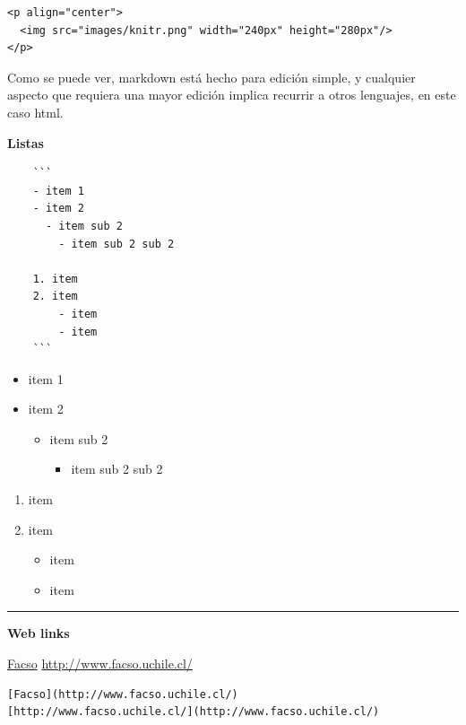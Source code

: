 \documentclass[11pt,]{book}
\providecommand{\tightlist}{%
  \setlength{\itemsep}{0pt}\setlength{\parskip}{0pt}}
\begin{document}
\begin{verbatim}
<p align="center">
  <img src="images/knitr.png" width="240px" height="280px"/>
</p>
\end{verbatim}

Como se puede ver, markdown está hecho para edición simple, y cualquier aspecto que requiera una mayor edición implica recurrir a otros lenguajes, en este caso html.

\textbf{Listas}

\begin{verbatim}
    ```
    - item 1
    - item 2
      - item sub 2
        - item sub 2 sub 2

    1. item
    2. item
        - item
        - item
    ```
\end{verbatim}

\begin{itemize}
\tightlist
\item
  item 1
\item
  item 2

  \begin{itemize}
  \tightlist
  \item
    item sub 2

    \begin{itemize}
    \tightlist
    \item
      item sub 2 sub 2
    \end{itemize}
  \end{itemize}
\end{itemize}

\begin{enumerate}
\def\labelenumi{\arabic{enumi}.}
\tightlist
\item
  item
\item
  item

  \begin{itemize}
  \tightlist
  \item
    item
  \item
    item
  \end{itemize}
\end{enumerate}

\begin{center}\rule{0.5\linewidth}{\linethickness}\end{center}

\textbf{Web links}

\href{http://www.facso.uchile.cl/}{Facso}
\url{http://www.facso.uchile.cl/}

\begin{verbatim}
[Facso](http://www.facso.uchile.cl/)
[http://www.facso.uchile.cl/](http://www.facso.uchile.cl/)
\end{verbatim}
\end{document}
